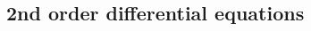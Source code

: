 \documentclass{article}
\begin{document}
\begin{multicols*}{2}
\begin{itemize}
\begin{enumerate}
    \end{enumerate}

\end{itemize}

\subsection{2nd order differential equations}




\end{multicols*}
\end{document}
